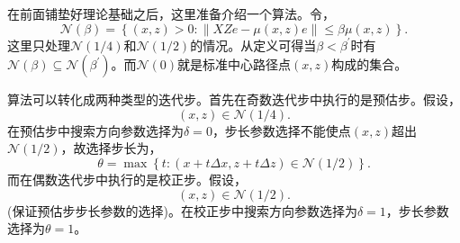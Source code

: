 \documentclass{ctexart}
\numberwithin{equation}{section} %
\begin{document}
在前面铺垫好理论基础之后，这里准备介绍一个算法。令，
\begin{equation}
	\mathcal{N}\left(\beta\right) = \left\{\left(x, z\right) > 0 : \parallel XZe - \mu\left(x, z\right)e\parallel \leq \beta\mu\left(x, z\right)\right\}. \nonumber
\end{equation}
这里只处理$ \mathcal{N}\left(1/4\right) $和$ \mathcal{N}\left(1/2\right) $的情况。从定义可得当$ \beta < {\beta}^{'} $时有$ \mathcal{N}\left(\beta\right) \subseteq \mathcal{N}\left(\beta^{'}\right)  $。而$ \mathcal{N}\left(0\right) $就是标准中心路径点$ \left(x, z\right) $构成的集合。

算法可以转化成两种类型的迭代步。首先在奇数迭代步中执行的是预估步。假设，
\begin{equation}
	\left(x, z\right) \in \mathcal{N}\left(1/4\right). \nonumber
\end{equation}
在预估步中搜索方向参数选择为$ \delta = 0 $，步长参数选择不能使点$ \left(x, z\right) $超出$ \mathcal{N}\left(1/2\right) $，故选择步长为，
\begin{equation}
	\label{Eq: predictorStepLength}
	\theta = \max\left\{t:\left(x + t\Delta x, z + t\Delta z\right) \in \mathcal{N}\left(1/2\right) \right\}.
\end{equation}
而在偶数迭代步中执行的是校正步。假设，
\begin{equation}
	\left(x, z\right) \in \mathcal{N}\left(1/2\right). \nonumber
\end{equation}
(保证预估步步长参数的选择)。在校正步中搜索方向参数选择为$ \delta = 1 $，步长参数选择为$ \theta = 1 $。
\end{document}

